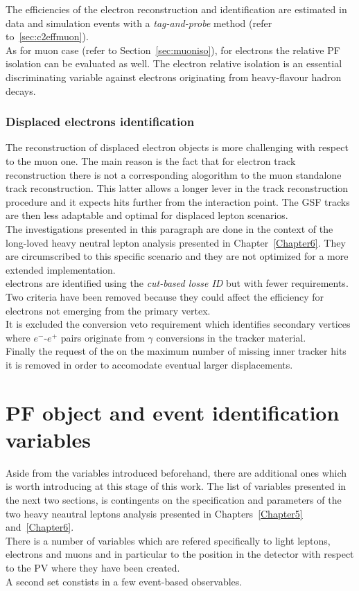 The efficiencies of the electron reconstruction and identification are
estimated in data and simulation events with a \emph{tag-and-probe}
method (refer to~\ref{sec:c2effmuon}).\\

As for muon case (refer to Section~\ref{sec:muoniso}), for electrons
the relative PF isolation can be evaluated as well. The electron
relative isolation is an essential discriminating variable against 
electrons originating from heavy-flavour hadron decays.


\subsubsection{Displaced electrons identification}\label{sec:c2dispele}

The reconstruction of displaced electron objects is more challenging
with respect to the muon one. 
The main reason is the fact that for electron track reconstruction
there is not a corresponding alogorithm to the muon standalone track
reconstruction. This latter allows a longer lever in the track
reconstruction procedure and it expects hits
further from the interaction point. The GSF tracks are then less
adaptable and optimal for displaced lepton scenarios.\\

The investigations presented in this paragraph are done in the context
of the long-loved heavy neutral lepton analysis presented in
Chapter~\ref{Chapter6}. They are circumscribed
to this specific scenario and they are not optimized for a more extended
implementation.  \\

\Displ electrons are identified using the \emph{cut-based losse ID}
but with fewer requirements. Two criteria have been removed because
they could affect the efficiency for electrons
not emerging from the primary vertex. \\
It is excluded the conversion veto requirement which identifies
secondary vertices where $e^{-}$-$e^{+}$ pairs 
originate from $\gamma$ conversions in the tracker material.\\
Finally the request of the on the maximum number of
missing inner tracker hits it is removed in order to accomodate 
eventual larger displacements. 


\clearpage
\section{PF object and event identification
  variables}\label{sec:c2variables}
Aside from the variables introduced beforehand, there are additional
ones which is worth introducing at this stage of this work. 
The list of variables presented in the next two sections, is
contingents on the specification and parameters of the two heavy
neautral leptons analysis presented in Chapters~\ref{Chapter5}
and~\ref{Chapter6}.\\
There is a number of variables which are refered specifically to light
leptons, electrons and muons and in particular to the position in the
detector with
respect to the PV where they have been created. \\
A second set constists in a few event-based observables. 


